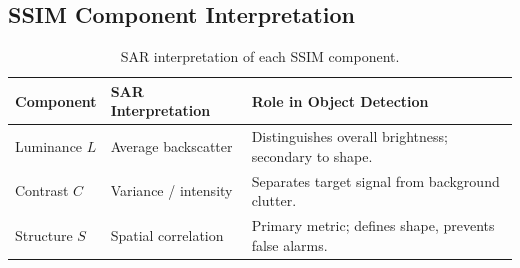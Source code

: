 \documentclass[12pt]{article}
\begin{document}
\subsection{SSIM Component Interpretation}

\begin{table}[H]
    \centering
    \caption{SAR interpretation of each SSIM component.}
    \begin{tabular}{lll}
        \toprule
        Component & SAR Interpretation & Role in Object Detection \\
        \midrule
        Luminance $L$ & Average backscatter &
            Distinguishes overall brightness; secondary to shape. \\
        Contrast $C$ & Variance / intensity &
            Separates target signal from background clutter. \\
        Structure $S$ & Spatial correlation &
            Primary metric; defines shape, prevents false alarms. \\
        \bottomrule
    \end{tabular}
\end{table}
\end{document}

